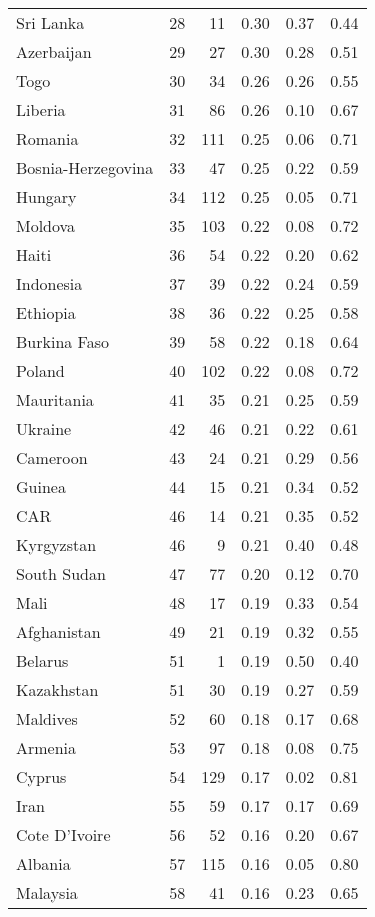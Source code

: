 \begin{longtable}[t]{lrrrrr}
Sri Lanka & 28 & 11 & 0.30 & 0.37 & 0.44\\
Azerbaijan & 29 & 27 & 0.30 & 0.28 & 0.51\\
Togo & 30 & 34 & 0.26 & 0.26 & 0.55\\
\addlinespace
Liberia & 31 & 86 & 0.26 & 0.10 & 0.67\\
Romania & 32 & 111 & 0.25 & 0.06 & 0.71\\
Bosnia-Herzegovina & 33 & 47 & 0.25 & 0.22 & 0.59\\
Hungary & 34 & 112 & 0.25 & 0.05 & 0.71\\
Moldova & 35 & 103 & 0.22 & 0.08 & 0.72\\
\addlinespace
Haiti & 36 & 54 & 0.22 & 0.20 & 0.62\\
Indonesia & 37 & 39 & 0.22 & 0.24 & 0.59\\
Ethiopia & 38 & 36 & 0.22 & 0.25 & 0.58\\
Burkina Faso & 39 & 58 & 0.22 & 0.18 & 0.64\\
Poland & 40 & 102 & 0.22 & 0.08 & 0.72\\
\addlinespace
Mauritania & 41 & 35 & 0.21 & 0.25 & 0.59\\
Ukraine & 42 & 46 & 0.21 & 0.22 & 0.61\\
Cameroon & 43 & 24 & 0.21 & 0.29 & 0.56\\
Guinea & 44 & 15 & 0.21 & 0.34 & 0.52\\
CAR & 46 & 14 & 0.21 & 0.35 & 0.52\\
\addlinespace
Kyrgyzstan & 46 & 9 & 0.21 & 0.40 & 0.48\\
South Sudan & 47 & 77 & 0.20 & 0.12 & 0.70\\
Mali & 48 & 17 & 0.19 & 0.33 & 0.54\\
Afghanistan & 49 & 21 & 0.19 & 0.32 & 0.55\\
Belarus & 51 & 1 & 0.19 & 0.50 & 0.40\\
\addlinespace
Kazakhstan & 51 & 30 & 0.19 & 0.27 & 0.59\\
Maldives & 52 & 60 & 0.18 & 0.17 & 0.68\\
Armenia & 53 & 97 & 0.18 & 0.08 & 0.75\\
Cyprus & 54 & 129 & 0.17 & 0.02 & 0.81\\
Iran & 55 & 59 & 0.17 & 0.17 & 0.69\\
\addlinespace
Cote D'Ivoire & 56 & 52 & 0.16 & 0.20 & 0.67\\
Albania & 57 & 115 & 0.16 & 0.05 & 0.80\\
Malaysia & 58 & 41 & 0.16 & 0.23 & 0.65\\

\end{longtable}
